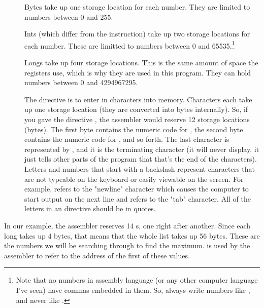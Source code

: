 \begin{description}
\item[] Bytes take up one storage location for each number.  They are limited
to numbers between 0 and 255.
\item[] Ints (which differ from the  instruction) take up
two storage locations for each number.  These are limitted to numbers
between 0 and 65535.\footnote{Note that no numbers in assembly language
(or any other computer language I've seen) have commas embedded in them.  So,
always write numbers like , and never like 
.}
\item[] Longs take up four storage locations.  This is the same amount of 
space the registers use, which is why they are used in this program.
They can hold numbers between 0 and 4294967295.
\item[] The  directive is to enter in characters
into memory.  Characters each take up one storage location (they are
converted into bytes internally).  So, if you gave the directive
, the assembler would reserve 12 storage
locations (bytes).  The first byte contains the numeric code for 
, the second byte contains the numeric code for
, and so forth.  The last character is represented
by , 
and it is the terminating character (it will 
never display, it just tells other parts of the program that that's the
end of the characters).  Letters and numbers that start with a backslash
represent characters that are not typeable on the keyboard or easily viewable
on the screen.  
For example, \icode{\\n}\index{\\n} refers to the "newline" character which causes the computer to start output on the next line and \icode{\\t}
\index{\\t} refers to the "tab" character.  All of the letters in an  directive should be in quotes.
\end{description}

In our example, the assembler reserves 14 s,
one right after another.  Since each long takes up 4 bytes, that means
that the whole list takes up 56 bytes.  These are the numbers we will
be searching through to find the maximum.  
is used by the assembler to refer to the address of the first of these values.

